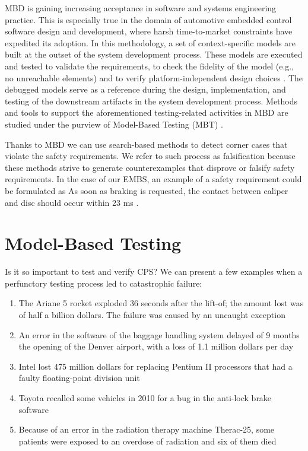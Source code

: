 MBD is gaining increasing acceptance in software and systems engineering practice. This is especially true in the domain of automotive embedded control software design and development, where harsh time-to-market constraints have expedited its adoption. In this methodology, a set of context-specific models are built at the outset of the system development process. These models are executed and tested to validate the requirements, to check the fidelity of the model (e.g., no unreachable elements) and to verify platform-independent design choices \cite{Mohalik:ModelCheckingSimulink}. The debugged models serve as a reference during the design, implementation, and testing of the downstream artifacts in the system development process. Methods and tools to support the aforementioned testing-related activities in MBD are studied under the purview of Model-Based Testing (MBT) \cite{Dalal:MBT}.

Thanks to MBD we can use search-based methods to detect corner cases that violate the safety requirements. We refer to such process as falsification because these methods strive to generate counterexamples that disprove or falsify safety requirements. In the case of our EMBS, an example of a safety requirement could be formulated as As soon as braking is requested, the contact between caliper and disc should occur within 23 ms \cite{Oehlerking:EMBS}.

\section{Model-Based Testing} \label{sec:num3}

Is it so important to test and verify CPS? We can present a few examples when a perfunctory testing process led to catastrophic failure:

\begin{enumerate}
    \item The Ariane 5 rocket exploded 36 seconds after the lift-of; the amount lost was of half a billion dollars. The failure was caused by an uncaught exception \cite{Ariane5:Failure}
    \item An error in the software of the baggage handling system delayed of 9 months the opening of the Denver airport, with a loss of 1.1 million dollars per day \cite{Donaldson:DenverAirportProblem}
    \item Intel lost 475 million dollars for replacing Pentium II processors that had a faulty floating-point division unit \cite{Khan:IndustrialInformatics}
    \item Toyota recalled some vehicles in 2010 for a bug in the anti-lock brake software \cite{Fan:Toyota}
    \item Because of an error in the radiation therapy machine Therac-25, some patients were exposed to an overdose of radiation and six of them died \cite{Leveson:Therac25}
\end{enumerate}

